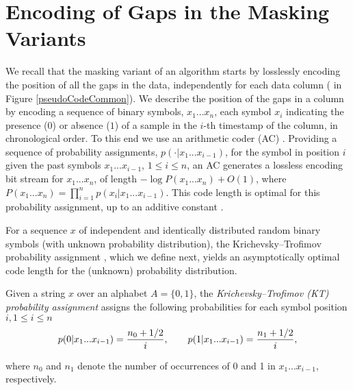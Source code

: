 
\section{Encoding of Gaps in the Masking Variants}
\label{algo:maskmodes}


\newcommand{\xOneN}{x_1...x_n}
\newcommand{\StringSeq}{x_1...x_{i-1}}
\newcommand{\xiiminus}{p(x_i|\StringSeq)}
\newcommand{\xiiminustwo}{p(\cdot|\StringSeq)}
\vspace{-5pt}
We recall that the masking variant of an algorithm starts by losslessly encoding the position of all the gaps in the data, independently for each data column ( in Figure \ref{pseudoCodeCommon}). We describe the position of the gaps in a column by encoding a sequence of binary symbols, $\xOneN$, each symbol $x_i$ indicating the presence ($0$) or absence ($1$) of a sample in the $i$-th timestamp of the column, in chronological order. To this end we use an arithmetic coder (AC) \cite{ac2, Cover2005}. Providing a sequence of probability assignments, $\xiiminustwo$, for the symbol in position $i$ given the past symbols $x_1...x_{i-1}$, $1\leq i \leq n$, an AC generates a lossless encoding bit stream for $\xOneN$, of length $-\log P(\xOneN) + O(1)$, where $P(\xOneN)=\prod_{i=1}^{n}\xiiminus$. This code length is optimal for this probability assignment, up to an additive constant \cite{arcoding}.


For a sequence $x$ of independent and identically distributed random binary symbols (with unknown probability distribution), the Krichevsky–Trofimov probability assignment \cite{ktestimator}, which we define next, yields an asymptotically optimal code length for the (unknown) probability distribution.


\begin{defcion}
\label{def:ktestimator}
Given a string $x$ over an alphabet $A = \{0, 1\}$, the \textit{Krichevsky–Trofimov (KT) probability assignment} assigns the following probabilities for each symbol position $i, 1\leq i \leq n$
\vspace{-2pt}
\begin{equation}
\label{eq:ktestimator}
p(0|\StringSeq) = \frac{n_0 + 1/2}{i}, \hspace{+20pt} p(1|\StringSeq) = \frac{n_1 + 1/2}{i},
\end{equation}
\end{defcion}
\vspace{-8pt}
where $n_0$ and $n_1$ denote the number of occurrences of 0 and 1 in $\StringSeq$, respectively.


